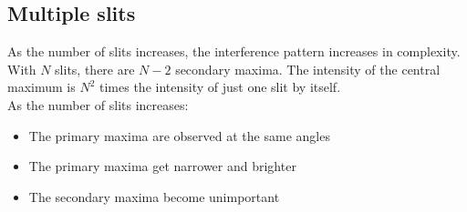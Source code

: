 \documentclass[a4paper,12pt]{article}
\begin{document}
\subsection{Multiple slits}
As the number of slits increases, the interference pattern increases in complexity. 
With $N$ slits, there are $N-2$ secondary maxima. The intensity of the central maximum is $N^2$ times the intensity of just one slit by itself.\\
As the number of slits increases:
\begin{itemize}
  \item The primary maxima are observed at the same angles
  \item The primary maxima get narrower and brighter
  \item The secondary maxima become unimportant
\end{itemize}
\end{document}
